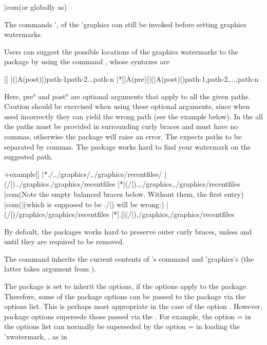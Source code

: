 \documentclass[
  use-a4-paper,
  use-10pt-font,
  final-version,
  use-UK-English,
  fancy-section-headings,
  frame-section-numbers,
  para-abstract-style,
  input-config-file,
  no-hyperref-messages,
  option-stack-limit=4,
  inputfile=true,
]{amltxdoc}
\begin{document}
|com(or globally as)
\fxi*{\GraphicsOptions}

The commands \hhx'{\DeclareGraphicsExtensions, \DeclareGraphicsRule} of the \pkg'{graphics} can still be invoked before setting graphics watermarks.



Users can suggest the possible locations of the graphics watermarks to the package by using the command \fx{\watermarkpaths}, whose syntaxes are

[\watermarkpaths]
\watermarkpaths[|A(pre)]|(|A(post)|){{path-1}{path-2}...{path-n}}
\watermarkpaths|*[|A(pre)]|(|A(post)|){path-1,path-2,...,path-n}
\fxi*{\watermarkpaths}

Here, \ang{pre} and \ang{post} are optional arguments that apply to all the given paths. Caution should be exercised when using these optional arguments, since when used incorrectly they can yield the wrong path (see the example below). In the \unstform all the paths must be provided in surrounding curly braces and must have no commas, otherwise the package will raise an error. The \stform expects paths to be separated by commas. The package works hard to find your watermark on the suggested path.

\start+{example}[\watermarkpaths]
\watermarkpaths|*{./,./graphics/,./graphics/recentfiles/}
\watermarkpaths|(/|){{.}{./graphics}{./graphics/recentfiles}}
\watermarkpaths|*|(/|){.,./graphics,./graphics/recentfiles}
|com(Note the empty balanced braces below. Without them, the first entry)
|com(|(which is supposed to be {./}|) will be wrong:)
\watermarkpaths[.]|(/|){{}{/graphics}{/graphics/recentfiles}}
\watermarkpaths|*[.]|(/|){{},/graphics,/graphics/recentfiles}

By default, the packages works hard to preserve outer curly braces, unless and until they are required to be removed.

The command \fx{\watermarkpaths} inherits the current contents of \latex's  command and \pkg'{graphics}'s \hx{\Ginput@path} (the latter takes argument from \hx{\graphicspath}).




The package is set to inherit the \hx{\documentclass} options, if the options apply to the package. Therefore, some of the package options can be passed to the package via the \hx{\documentclass} options list. This is perhaps most appropriate in the case of the option . However, package options supersede those passed via the \hx{\documentclass}. For example, the option = in the \hx{\documentclass} options list can normally be superseded by the option = in loading the \pkg'{xwatermark}, \eg, as in
\end{document}
